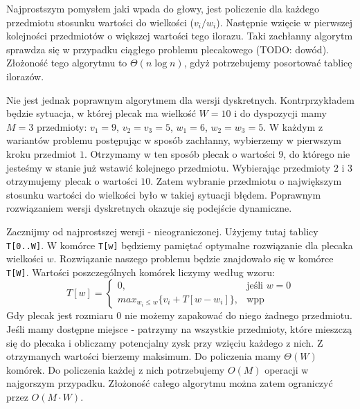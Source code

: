 Najprostszym pomysłem jaki wpada do głowy, jest policzenie dla każdego przedmiotu stosunku wartości do wielkości ($v_i / w_i$).
Następnie wzięcie w pierwszej kolejności przedmiotów o większej wartości tego ilorazu.
Taki zachłanny algorytm sprawdza się w przypadku ciągłego problemu plecakowego (TODO: dowód).
Złożoność tego algorytmu to $\Theta(n \log n)$, gdyż potrzebujemy posortować tablicę ilorazów.

Nie jest jednak poprawnym algorytmem dla wersji dyskretnych.
Kontrprzykładem będzie sytuacja, w której plecak ma wielkość $W = 10$ i do dyspozycji mamy $M = 3$ przedmioty: $v_1=9$, $v_2=v_3=5$, $w_1=6$, $w_2=w_3=5$.
W każdym z wariantów problemu postępując w sposób zachłanny, wybierzemy w pierwszym kroku przedmiot $1$.
Otrzymamy w ten sposób plecak o wartości $9$, do którego nie jesteśmy w stanie już wstawić kolejnego przedmiotu.
Wybierając przedmioty $2$ i $3$ otrzymujemy plecak o wartości $10$.
Zatem wybranie przedmiotu o największym stosunku wartości do wielkości było w takiej sytuacji błędem.
Poprawnym rozwiązaniem wersji dyskretnych okazuje się podejście dynamiczne.

Zacznijmy od najprostszej wersji - nieograniczonej.
Użyjemy tutaj tablicy \texttt{T[0..W]}.
W komórce \texttt{T[w]} będziemy pamiętać optymalne rozwiązanie dla plecaka wielkości $w$.
Rozwiązanie naszego problemu będzie znajdowało się w komórce \texttt{T[W]}.
Wartości poszczególnych komórek liczymy według wzoru:
\begin{equation*}
  T[w] = \begin{cases}
    0, & \text{jeśli $w = 0$}\\
    max_{w_i \leq w}\{v_i + T[w - w_i]\}, & \text{wpp}
  \end{cases}
\end{equation*}
Gdy plecak jest rozmiaru $0$ nie możemy zapakować do niego żadnego przedmiotu.
Jeśli mamy dostępne miejsce - patrzymy na wszystkie przedmioty, które mieszczą się do plecaka i obliczamy potencjalny zysk przy wzięciu każdego z nich.
Z otrzymanych wartości bierzemy maksimum.
Do policzenia mamy $\Theta(W)$ komórek.
Do policzenia każdej z nich potrzebujemy $O(M)$ operacji w najgorszym przypadku.
Złożoność całego algorytmu można zatem ograniczyć przez $O(M \cdot W)$.

